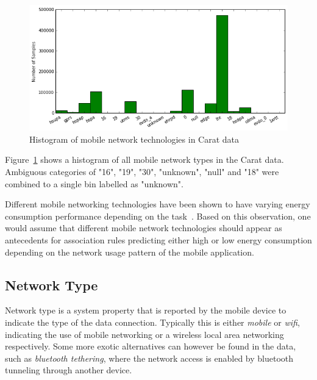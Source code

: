 \begin{figure} %
	\centering
	\includegraphics[width=\textwidth]{images/carat-data/mobile_net_type.png}
	\caption{Histogram of mobile network technologies in Carat data}
	\label{figure:carat-data-mobile-net-type}
\end{figure}   

Figure~\ref{figure:carat-data-mobile-net-type} shows a histogram of all mobile network types in the Carat data. Ambiguous categories of "16", "19", "30", "unknown", "null" and "18" were combined to a single bin labelled as "unknown". 

Different mobile networking technologies have been shown to have varying energy consumption performance depending on the task~\cite{5357972}. Based on this observation, one would assume that different mobile network technologies should appear as antecedents for association rules predicting either high or low energy consumption depending on the network usage pattern of the mobile application.  


\subsection{Network Type}  

Network type is a system property that is reported by the mobile device to indicate the type of the data connection. Typically this is either \textit{mobile} or \textit{wifi}, indicating the use of mobile networking or a wireless local area networking respectively. Some more exotic alternatives can however be found in the data, such as \textit{bluetooth tethering}, where the network access is enabled by bluetooth tunneling through another device.

